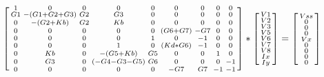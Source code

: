 \begin{equation}
\begin{bsmallmatrix}
1 & 0 & 0 & 0 & 0 & 0 & 0 & 0 & 0\\
G1 & -(G1 + G2 + G3) & G2 & G3 & 0 & 0 & 0 & 0 & 0\\
0 & -(G2+Kb) & G2 & Kb & 0 & 0 & 0 & 0 & 0\\
0 & 0 & 0 & 0 & 0 & (G6 + G7) & -G7 & 0 & 0\\
0 & 0 & 0 & 0 & 1 & 0 & -1 & 0 & 0\\
0 & 0 & 0 & 1 & 0 & (Kd * G6) & -1 & 0 & 0\\
0 & Kb & 0 & -(G5 + Kb) & G5 & 0 & 0 & 1 & 0\\
0 & G3 & 0 & (-G4-G3-G5) & G6 & 0 & 0 & 0 & -1\\
0 & 0 & 0 & 0 & 0 & -G7 & G7 & -1 & -1
\end{bsmallmatrix}
*
\begin{bsmallmatrix}
V1\\V2\\V3\\V5\\V6\\V7\\V8\\Ix\\Iy
\end{bsmallmatrix}
=
\begin{bsmallmatrix}
Vss\\0\\0\\0\\Vx\\0\\0\\0\\0
\end{bsmallmatrix}
\end{equation}

\vspace{20pt}


